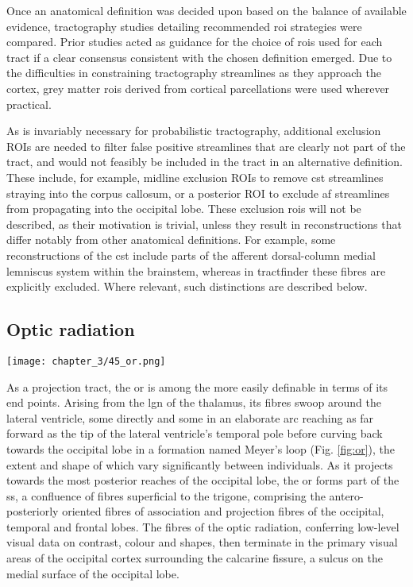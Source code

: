 Once an anatomical definition was decided upon based on the balance of available evidence, tractography studies detailing recommended \gls{roi} strategies were compared.
Prior studies acted as guidance for the choice of \glspl{roi} used for each tract if a clear consensus consistent with the chosen definition emerged.
Due to the difficulties in constraining tractography streamlines as they approach the cortex, grey matter \glspl{roi} derived from cortical parcellations were used wherever practical.

As is invariably necessary for probabilistic tractography, additional exclusion ROIs are needed to filter false positive streamlines that are clearly not part of the tract, and would not feasibly be included in the tract in an alternative definition.
These include, for example, midline exclusion ROIs to remove \gls{cst} streamlines straying into the corpus callosum, or a posterior ROI to exclude \gls{af} streamlines from propagating into the occipital lobe.
These exclusion \glspl{roi} will not be described, as their motivation is trivial, unless they result in reconstructions that differ notably from other anatomical definitions.
For example, some reconstructions of the \gls{cst} include parts of the afferent dorsal-column medial lemniscus system within the brainstem, whereas in tractfinder these fibres are explicitly excluded.
Where relevant, such distinctions are described below.

\subsection{Optic radiation}

\begin{SCfigure}[][htb!]
  \texttt{[image: chapter\_3/45\_or.png]}
  \caption{Schematic reconstruction of the \gls{or}, shown from an inferior axial viewpoint. Fibres originating in the \gls{lgn} of the thalamus arch anteriorly forming Meyer's loop, before returning towards the visual centres in the occipital cortex.}
  \label{fig:or}
\end{SCfigure}

As a projection tract, the \gls{or} is among the more easily definable in terms of its end points.
Arising from the \gls{lgn} of the thalamus, its fibres swoop around the lateral ventricle, some directly and some in an elaborate arc reaching as far forward as the tip of the lateral ventricle's temporal pole before curving back towards the occipital lobe in a formation named Meyer's loop (Fig. \ref{fig:or})\autocite{Sarubbo2015}, the extent and shape of which vary significantly between individuals\autocite{Ebeling1988,Yogarajah2009}.
As it projects towards the most posterior reaches of the occipital lobe, the \gls{or} forms part of the \gls{ss}, a confluence of fibres superficial to the \gls{trigone}, comprising the antero-posteriorly oriented fibres of association and projection fibres of the occipital, temporal and frontal lobes.\autocite{Maldonado2021}
The fibres of the optic radiation, conferring low-level visual data on contrast, colour and shapes, then terminate in the primary visual areas of the occipital cortex surrounding the calcarine fissure, a sulcus on the medial surface of the occipital lobe.

